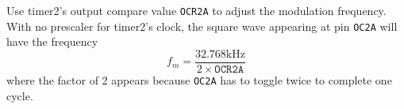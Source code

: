 Use timer2's output compare value \texttt{OCR2A} to adjust the modulation frequency.  With no prescaler for timer2's clock, the square wave appearing at pin \texttt{OC2A} will have the frequency
\begin{equation}
f_m = \frac{32.768\mathrm{kHz}}{2 \times \mathtt{OCR2A}}
\end{equation}
where the factor of 2 appears because \texttt{OC2A} has to toggle twice to complete one cycle.

